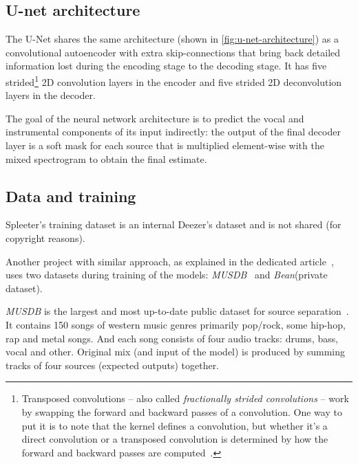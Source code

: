 \subsection{U-net architecture}\label{subsec:music-source-separation:u-net-architecture}
The U-Net shares the same architecture (shown in \cref{fig:u-net-architecture}) as a convolutional autoencoder with
extra skip-connections that bring back detailed information lost during the encoding stage to the decoding stage. It has
five strided\footnote{Transposed convolutions – also called \textit{fractionally strided convolutions} – work by
swapping the forward and backward passes of a convolution. One way to put it is to note that the kernel defines
a convolution, but whether it’s a direct convolution or a transposed convolution is determined by how the forward and
backward passes are computed~\cite{dumoulin2016guide}.} 2D convolution layers in the encoder and five strided 2D
deconvolution layers in the decoder.

The goal of the neural network architecture is to predict the vocal and instrumental components of its input indirectly:
the output of the final decoder layer is a soft mask for each source that is multiplied element-wise with the mixed
spectrogram to obtain the final estimate.


\pagebreak

\subsection{Data and training}\label{subsec:music-source-separation:data-and-training}

Spleeter's training dataset is an internal Deezer's dataset and is not shared (for copyright reasons).

Another project with similar approach, as explained in the dedicated article~\cite{singing-voice-separation-article},
uses two datasets during training of the models: \textit{MUSDB}~\cite{musdb18} and \textit{Bean}(private dataset).

\textit{MUSDB} is the largest and most up-to-date public dataset for source separation~\cite{musdb18}. It contains 150
songs of western music genres primarily pop/rock, some hip-hop, rap and metal songs. And each song consists of four
audio tracks: drums, bass, vocal and other. Original mix (and input of the model) is produced by summing tracks of four
sources (expected outputs) together.


